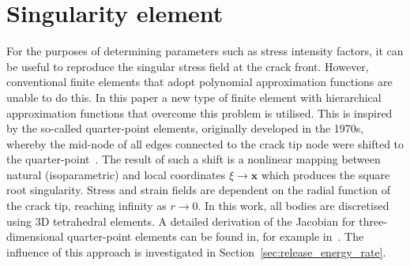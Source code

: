 \documentclass[onecolumn]{svjour3}
\begin{document}
\section{Singularity element}
\label{sec:singularity}
For the purposes of determining parameters such as stress intensity factors, it can be useful to reproduce the singular stress field at the crack front. However, conventional finite elements that adopt polynomial approximation functions are unable to do this. 
In this paper a new type of finite element with hierarchical approximation functions that overcome this problem is utilised. This is inspired by the so-called quarter-point elements, originally developed in the 1970s, whereby the mid-node of all edges connected to the crack tip node were shifted to the quarter-point~\cite{barsoum1976use,henshell1975crack}. 
% 
The result of such a shift is a nonlinear mapping between natural (isoparametric) and local coordinates $\xi \rightarrow \mathbf x$ which produces the square root singularity. Stress and strain fields are dependent on the radial function of the crack tip, reaching infinity as $ r \rightarrow 0$. 
% 
In this work, all bodies are discretised using 3D tetrahedral elements. A detailed derivation of the Jacobian for three-dimensional quarter-point elements can be found in, for example in~\citep{nejati2015use}. 
The influence of this approach is investigated in Section~\ref{sec:release_energy_rate}.

\end{document}
